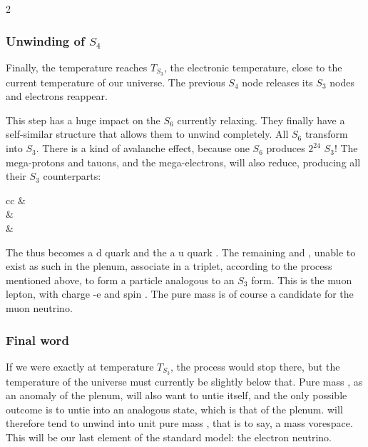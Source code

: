 \begin{multicols}{2}
	\subsubsection{Unwinding of $S_4$}
	
	Finally, the temperature reaches $T_{S_3}$, the electronic temperature, close to the current temperature of our universe. The previous $S_4$ node releases its $S_3$ nodes and electrons reappear.
	
	This step has a huge impact on the $S_6$ currently relaxing. They finally have a self-similar structure that allows them to unwind completely. All $S_6$ transform into $S_3$. There is a kind of avalanche effect, because one $S_6$ produces $2^{24}$ $S_3$! The mega-protons and tauons, and the mega-electrons, will also reduce, producing all their $S_3$ counterparts:
	
	\begin{center}
		\begin{tblr}{cc}
			       &         \\
			 &  \\
			 &  \\
		\end{tblr}
	\end{center}
	
	The  thus becomes a d quark  and the  a u quark . The remaining  and , unable to exist as such in the plenum, associate in a triplet, according to the process mentioned above, to form a particle analogous to an $S_3$ form. This is the muon lepton, with charge -e and spin . The pure mass  is of course a candidate for the muon neutrino.
	
	\subsubsection{Final word}
	
	If we were exactly at temperature $T_{S_3}$, the process would stop there, but the temperature of the universe must currently be slightly below that. Pure mass , as an anomaly of the plenum, will also want to untie itself, and the only possible outcome is to untie into an analogous state, which is that of the plenum.  will therefore tend to unwind into unit pure mass , that is to say, a mass vorespace. This will be our last element of the standard model: the electron neutrino.
	

\end{multicols}
